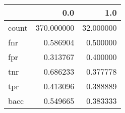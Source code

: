 \begin{tabular}{lrr}
\toprule
{} &         0.0 &        1.0 \\
\midrule
count &  370.000000 &  32.000000 \\
fnr   &    0.586904 &   0.500000 \\
fpr   &    0.313767 &   0.400000 \\
tnr   &    0.686233 &   0.377778 \\
tpr   &    0.413096 &   0.388889 \\
bacc  &    0.549665 &   0.383333 \\
\bottomrule
\end{tabular}
